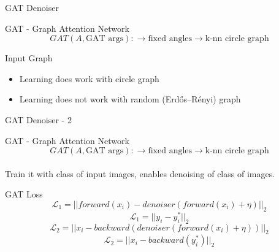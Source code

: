 \documentclass[aspectratio=169]{beamer}
\begin{document}
\begin{frame}{GAT Denoiser}
    \begin{block}{GAT - Graph Attention Network}
        $$ GAT (A, \text{GAT args}) : \to \text{fixed angles} \to \text{k-nn circle graph} $$
    \end{block}    
    
    \pause
    \begin{alertblock}{Input Graph}
        \begin{itemize}
            \item Learning does work with circle graph
            \item Learning does not work with random (Erdős–Rényi) graph
        \end{itemize}
    \end{alertblock}

\end{frame}

\begin{frame}{GAT Denoiser - 2}
    \begin{block}{GAT - Graph Attention Network}
        $$ GAT (A, \text{GAT args}) : \to \text{fixed angles} \to \text{k-nn circle graph} $$ \\
        Train it with class of input images, enables denoising of class of images.
    \end{block}    

    \begin{block}{GAT Loss}
        $$ \mathcal{L}_1 = || forward(x_i) - denoiser(forward(x_i) + \eta) ||_2 $$ 
        $$ \mathcal{L}_1 = || y_i - y_i^* ||_2 $$ 
        $$ \mathcal{L}_2 = || x_i - backward (denoiser(forward(x_i) + \eta)) ||_2 $$ 
        $$ \mathcal{L}_2 = || x_i - backward (y_i^*) ||_2 $$
    \end{block}

\end{frame}
\end{document}
